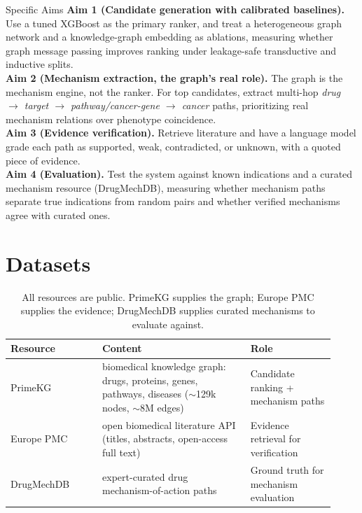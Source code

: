 \documentclass[11pt]{article}
\begin{document}
\begin{aimbox}{Specific Aims}
\textbf{Aim 1 (Candidate generation with calibrated baselines).} Use a tuned
XGBoost as the primary ranker, and treat a heterogeneous graph network and a
knowledge-graph embedding as ablations, measuring whether graph message passing
improves ranking under leakage-safe transductive and inductive splits.\\
\textbf{Aim 2 (Mechanism extraction, the graph's real role).} The graph is the
mechanism engine, not the ranker. For top candidates, extract multi-hop
\emph{drug $\rightarrow$ target $\rightarrow$ pathway/cancer-gene $\rightarrow$
cancer} paths, prioritizing real mechanism relations over phenotype coincidence.\\
\textbf{Aim 3 (Evidence verification).} Retrieve literature and have a language
model grade each path as supported, weak, contradicted, or unknown, with a quoted
piece of evidence.\\
\textbf{Aim 4 (Evaluation).} Test the system against known indications and a
curated mechanism resource (DrugMechDB), measuring whether mechanism paths
separate true indications from random pairs and whether verified mechanisms agree
with curated ones.
\end{aimbox}

\section{Datasets}

\begin{table}[H]
\centering\small
\begin{tabular}{>{\raggedright\arraybackslash}p{0.26\linewidth} >{\raggedright\arraybackslash}p{0.42\linewidth} >{\raggedright\arraybackslash}p{0.24\linewidth}}
\toprule
\rowcolor{sriblue}\color{white}\textbf{Resource} & \color{white}\textbf{Content} & \color{white}\textbf{Role}\\
\midrule
\rowcolor{srirow} PrimeKG & biomedical knowledge graph: drugs, proteins, genes, pathways, diseases ($\sim$129k nodes, $\sim$8M edges) & Candidate ranking + mechanism paths\\
Europe PMC & open biomedical literature API (titles, abstracts, open-access full text) & Evidence retrieval for verification\\
\rowcolor{srirow} DrugMechDB & expert-curated drug mechanism-of-action paths & Ground truth for mechanism evaluation\\
\bottomrule
\end{tabular}
\caption{All resources are public. PrimeKG supplies the graph; Europe PMC supplies
the evidence; DrugMechDB supplies curated mechanisms to evaluate against.}
\label{tab:data}
\end{table}
\end{document}

